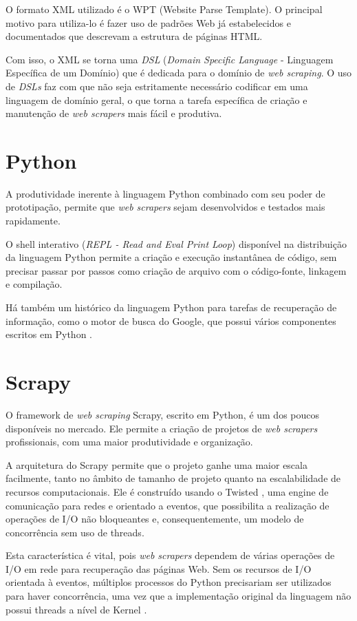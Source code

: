 O formato XML utilizado é o WPT (Website Parse Template)\cite{wpt}. O principal motivo para utiliza-lo é fazer uso de padrões Web já estabelecidos e documentados que descrevam a estrutura de páginas HTML.

Com isso, o XML se torna uma \emph{DSL} (\emph{Domain Specific Language} - Linguagem Específica de um Domínio) que é dedicada para o domínio de \emph{web scraping}. O uso de \emph{DSLs} faz com que não seja estritamente necessário codificar em uma linguagem de domínio geral, o que torna a tarefa específica de criação e manutenção de \emph{web scrapers} mais fácil e produtiva.

\section{Python}

A produtividade inerente à linguagem Python combinado com seu poder de prototipação, permite que \emph{web scrapers} sejam desenvolvidos e testados mais rapidamente.

O shell interativo (\emph{REPL - Read and Eval Print Loop}) disponível na distribuição da linguagem Python permite a criação e execução instantânea de código, sem precisar passar por passos como criação de arquivo com o código-fonte, linkagem e compilação.

Há também um histórico da linguagem Python para tarefas de recuperação de informação, como o motor de busca do Google, que possui vários componentes escritos em Python \cite{google}.

\section{Scrapy}

O framework de \emph{web scraping} Scrapy, escrito em Python, é um dos poucos disponíveis no mercado. Ele permite a criação de projetos de \emph{web scrapers} profissionais, com uma maior produtividade e organização.

A arquitetura do Scrapy permite que o projeto ganhe uma maior escala facilmente, tanto no âmbito de tamanho de projeto quanto na escalabilidade de recursos computacionais. Ele é construído usando o Twisted \cite{twisted}, uma engine de comunicação para redes e orientado a eventos, que possibilita a realização de operações de I/O não bloqueantes e, consequentemente, um modelo de concorrência sem uso de threads. 

Esta característica é vital, pois \emph{web scrapers} dependem de várias operações de I/O em rede para recuperação das páginas Web. Sem os recursos de I/O orientada à eventos, múltiplos processos do Python precisariam ser utilizados para haver concorrência, uma vez que a implementação original da linguagem não possui threads a nível de Kernel \cite{python_threads}.

